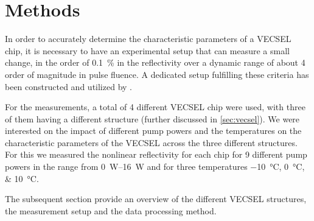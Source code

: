 \chapter{Methods}\label{chapter:methods}
In order to accurately determine the characteristic parameters of a VECSEL chip, it is necessary to have an experimental setup that can measure a small change, in the order of \qty{0.1}{\percent} in the reflectivity over a dynamic range of about 4 order of magnitude in pulse fluence. A dedicated setup fulfilling these criteria has been constructed and utilized by  \cite{Gaulke2021HighCharacterization, Heidrich2021FullRegime, Mangold2012VECSELCharacterization}.

For the measurements, a total of 4 different VECSEL chip were used, with three of them having a different structure (further discussed in \cref{sec:vecsel}). We were interested on the impact of different pump powers and the temperatures on the characteristic parameters of the VECSEL across the three different structures. For this we measured the nonlinear reflectivity for each chip for 9 different pump powers in the range from \qtyrange{0}{16}{\watt} and for three temperatures \qtylist{-10;0;10}{\degreeCelsius}.

The subsequent section provide an overview of the different VECSEL structures, the measurement setup and the data processing method.








